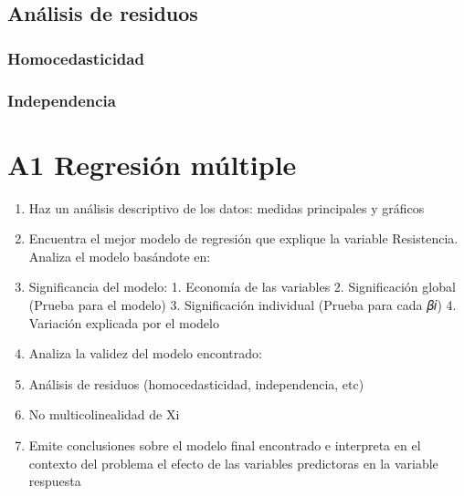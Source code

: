 \documentclass[
]{article}
\providecommand{\tightlist}{%
  \setlength{\itemsep}{0pt}\setlength{\parskip}{0pt}}
\begin{document}
\subsection{Análisis de residuos}\label{anuxe1lisis-de-residuos}

\subsubsection{Homocedasticidad}\label{homocedasticidad}

\subsubsection{Independencia}\label{independencia}

\section{A1 Regresión múltiple}\label{a1-regresiuxf3n-muxfaltiple}

\begin{enumerate}
\def\labelenumi{\arabic{enumi}.}
\tightlist
\item
  Haz un análisis descriptivo de los datos: medidas principales y
  gráficos
\item
  Encuentra el mejor modelo de regresión que explique la variable
  Resistencia. Analiza el modelo basándote en:
\item
  Significancia del modelo: 1. Economía de las variables 2.
  Significación global (Prueba para el modelo) 3. Significación
  individual (Prueba para cada 𝛽𝑖) 4. Variación explicada por el modelo
\item
  Analiza la validez del modelo encontrado:
\item
  Análisis de residuos (homocedasticidad, independencia, etc)
\item
  No multicolinealidad de Xi
\item
  Emite conclusiones sobre el modelo final encontrado e interpreta en el
  contexto del problema el efecto de las variables predictoras en la
  variable respuesta
\end{enumerate}
\end{document}
